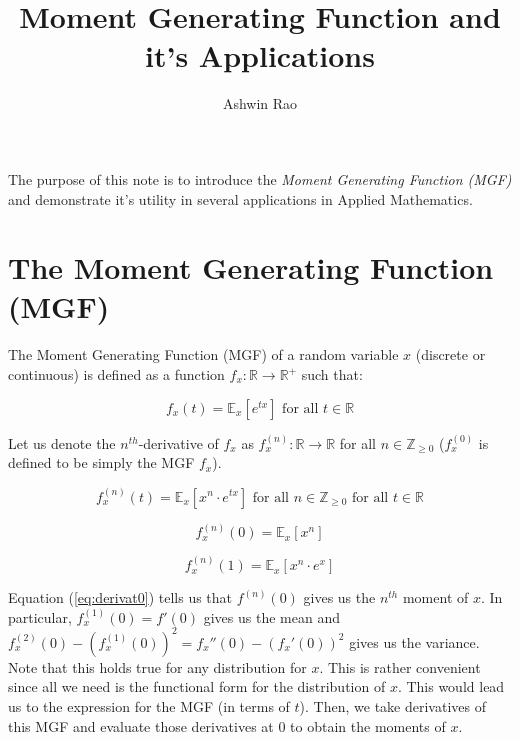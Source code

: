 \documentclass[10pt]{amsart}
\title{Moment Generating Function and it's Applications}
\author{Ashwin Rao}
\date{} %
\begin{document}
\maketitle

The purpose of this note is to introduce the {\em Moment Generating Function (MGF)} and demonstrate it's utility in several applications in Applied Mathematics. 

\section{The Moment Generating Function (MGF)}
The Moment Generating Function (MGF) of a random variable $x$ (discrete or continuous) is defined as a function $f_x : \mathbb{R} \rightarrow \mathbb{R}^+$ such that:

\begin{equation}
f_x(t) = \mathbb{E}_x[e^{tx}] \mbox{ for all } t \in \mathbb{R} \label{eq:mgfdef}
\end{equation}

Let us denote the $n^{th}$-derivative of $f_x$ as $f_x^{(n)} : \mathbb{R} \rightarrow \mathbb{R}$ for all $n\in \mathbb{Z}_{\geq 0}$ ($f_x^{(0)}$ is defined to be simply the MGF $f_x$).

\begin{equation}
f_x^{(n)}(t) = \mathbb{E}_x[x^n \cdot e^{tx}] \mbox{ for all } n\in \mathbb{Z}_{\geq 0} \mbox{ for all } t\in \mathbb{R} \label{eq:mgfderiv}
\end{equation}

\begin{equation}
f_x^{(n)}(0) = \mathbb{E}_x[x^n]  \label{eq:derivat0}
\end{equation}

\begin{equation}
f_x^{(n)}(1) = \mathbb{E}_x[x^n \cdot e^x]  \label{eq:derivat1}
\end{equation}

Equation (\ref{eq:derivat0}) tells us that $f^{(n)}(0)$ gives us the $n^{th}$ moment of $x$. In particular, $f_x^{(1)}(0) = f'(0)$ gives us the mean and $f_x^{(2)}(0) - (f_x^{(1)}(0))^2 = f_x''(0) - (f_x'(0))^2$ gives us the variance. Note that this holds true for any distribution for $x$. This is rather convenient since all we need is the functional form for the distribution of $x$. This would lead us to the expression for the MGF (in terms of $t$). Then, we take derivatives of this MGF and evaluate those derivatives at 0 to obtain the moments of $x$.
\end{document}
